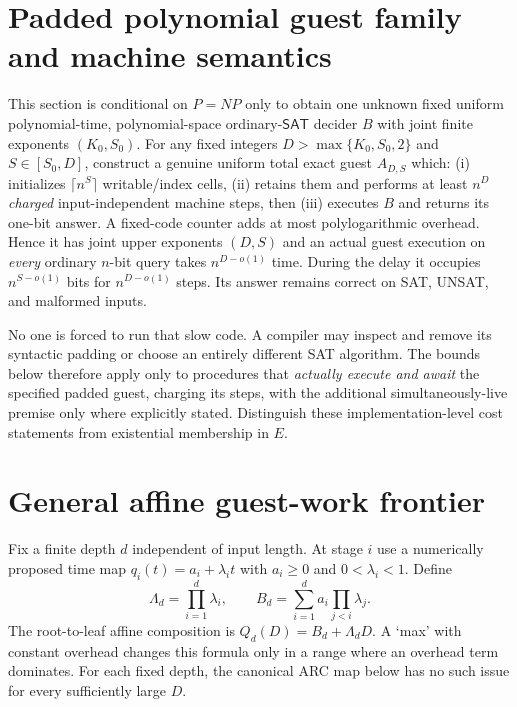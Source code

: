 \documentclass[11pt]{article}
\newcommand{\SAT}{\mathsf{SAT}}
\begin{document}
\section{Padded polynomial guest family and machine semantics}
This section is conditional on $P=NP$ only to obtain one unknown fixed
uniform polynomial-time, polynomial-space ordinary-$\SAT$ decider $B$ with
joint finite exponents $(K_0,S_0)$. For any fixed integers
$D>\max\{K_0,S_0,2\}$ and $S\in[S_0,D]$, construct a genuine uniform total
exact guest $A_{D,S}$ which: (i) initializes $\lceil n^S\rceil$ writable/index
cells, (ii) retains them and performs at least $n^D$ \emph{charged}
input-independent machine steps, then (iii) executes $B$ and returns its
one-bit answer. A fixed-code counter adds at most polylogarithmic overhead.
Hence it has joint upper exponents $(D,S)$ and an actual guest execution on
\emph{every} ordinary $n$-bit query takes $n^{D-o(1)}$ time. During the delay
it occupies $n^{S-o(1)}$ bits for $n^{D-o(1)}$ steps. Its answer remains
correct on SAT, UNSAT, and malformed inputs.

No one is forced to run that slow code. A compiler may inspect and remove
its syntactic padding or choose an entirely different SAT algorithm. The
bounds below therefore apply only to procedures that \emph{actually execute
and await} the specified padded guest, charging its steps, with the additional
simultaneously-live premise only where explicitly stated. Distinguish these
implementation-level cost statements from existential membership in $E$.

\section{General affine guest-work frontier}
Fix a finite depth $d$ independent of input length. At stage $i$ use a
numerically proposed time map $q_i(t)=a_i+\lambda_i t$ with
$a_i\ge0$ and $0<\lambda_i<1$. Define
\[
 \Lambda_d=\prod_{i=1}^d\lambda_i,\qquad
 B_d=\sum_{i=1}^d a_i\prod_{j<i}\lambda_j.
\]
The root-to-leaf affine composition is $Q_d(D)=B_d+\Lambda_dD$.
A `max' with constant overhead changes this formula only in a range where an
overhead term dominates. For each fixed depth, the canonical ARC map below
has no such issue for every sufficiently large $D$.
\end{document}
